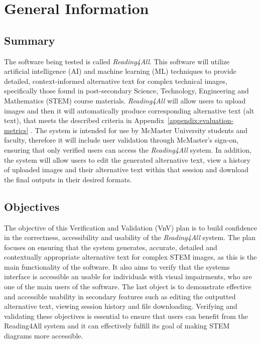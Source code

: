 \documentclass[12pt, titlepage]{article}
\begin{document}
\section{General Information} \label{geninfo}

\subsection{Summary}

The software being tested is called \textit{Reading4All}. This
software will utilize artificial intelligence (AI) and machine
learning (ML) techniques to provide detailed, context-informed
alternative text for complex technical images, specifically those
found in post-secondary Science, Technology, Engineering and Mathematics (STEM)
course materials. \textit{Reading4All} will allow users to upload
images and then it will automatically produce corresponding alternative text (alt text), that
meets the described criteria in Appendix~\ref{appendix:evaluation-metrics} . The system is intended for use by
McMaster University students and faculty, therefore it will include
user validation through McMaster's sign-on, ensuring that only
verified users can access the \textit{Reading4All} system.
In addition, the system will allow users to edit the generated
alternative text, view a history of uploaded images and their
alternative text within that session and download the final outputs
in their desired formats.

\subsection{Objectives}

The objective of this Verification and Validation (VnV) plan is to build confidence in the correctness, accessibility and usability of the \textit{Reading4All} system. 
The plan focuses on ensuring that the system generates, accurate, detailed and contextually appropriate alternative text for complex STEM images, as this is the main functionality of the software. 
It also aims to verify that the systems interface is accessible an usable for individuals with visual impairments, who are one of the main users of the software. The last object is to demonstrate effective and accessible usability in secondary features
such as editing the outputted alternative text, viewing session history and file downloading. 
Verifying and validating these objectives is essential to ensure that users can benefit from the Reading4All system and 
it can effectively fulfill its goal of making STEM diagrams more accessible.
\\
\end{document}
